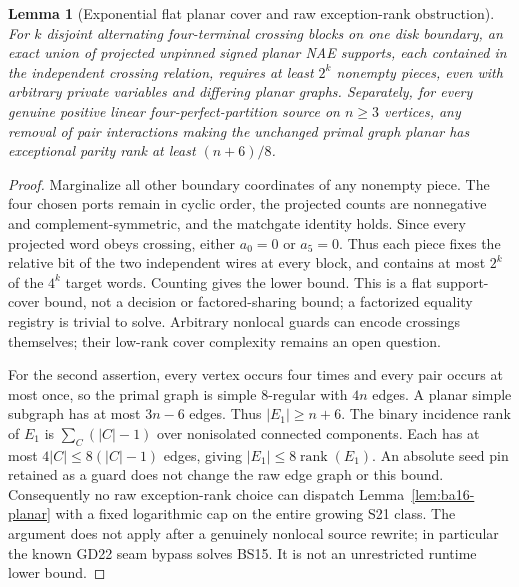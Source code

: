 \documentclass[11pt]{article}
\newtheorem{lemma}[theorem]{Lemma}
\begin{document}
\begin{lemma}[Exponential flat planar cover and raw exception-rank obstruction]\label{lem:ba16-cover}
For $k$ disjoint alternating four-terminal crossing blocks on one disk boundary, an exact union of projected unpinned signed planar NAE supports, each contained in the independent crossing relation, requires at least $2^k$ nonempty pieces, even with arbitrary private variables and differing planar graphs. Separately, for every genuine positive linear four-perfect-partition source on $n\ge3$ vertices, any removal of pair interactions making the unchanged primal graph planar has exceptional parity rank at least $(n+6)/8$.
\end{lemma}
\begin{proof}
Marginalize all other boundary coordinates of any nonempty piece. The four chosen ports remain in cyclic order, the projected counts are nonnegative and complement-symmetric, and the matchgate identity holds. Since every projected word obeys crossing, either $a_0=0$ or $a_5=0$. Thus each piece fixes the relative bit of the two independent wires at every block, and contains at most $2^k$ of the $4^k$ target words. Counting gives the lower bound. This is a flat support-cover bound, not a decision or factored-sharing bound; a factorized equality registry is trivial to solve. Arbitrary nonlocal guards can encode crossings themselves; their low-rank cover complexity remains an open question.

For the second assertion, every vertex occurs four times and every pair occurs at most once, so the primal graph is simple 8-regular with $4n$ edges. A planar simple subgraph has at most $3n-6$ edges. Thus $|E_1|\ge n+6$. The binary incidence rank of $E_1$ is $\sum_C(|C|-1)$ over nonisolated connected components. Each has at most $4|C|\le8(|C|-1)$ edges, giving $|E_1|\le8\operatorname{rank}(E_1)$. An absolute seed pin retained as a guard does not change the raw edge graph or this bound. Consequently no raw exception-rank choice can dispatch Lemma~\ref{lem:ba16-planar} with a fixed logarithmic cap on the entire growing S21 class. The argument does not apply after a genuinely nonlocal source rewrite; in particular the known GD22 seam bypass solves BS15. It is not an unrestricted runtime lower bound.
\end{proof}
\end{document}

